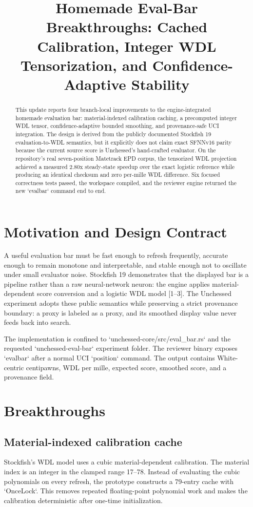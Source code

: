 \documentclass[10pt,conference]{IEEEtran}
\title{Homemade Eval-Bar Breakthroughs: Cached Calibration, Integer WDL Tensorization, and Confidence-Adaptive Stability}
\author{\IEEEauthorblockN{Manus AI}\IEEEauthorblockA{Unchessed UCI Engine Research\\September 2026}}
\begin{document}
\maketitle
\begin{abstract}
This update reports four branch-local improvements to the engine-integrated homemade evaluation bar: material-indexed calibration caching, a precomputed integer WDL tensor, confidence-adaptive bounded smoothing, and provenance-safe UCI integration. The design is derived from the publicly documented Stockfish 19 evaluation-to-WDL semantics, but it explicitly does not claim exact SFNNv16 parity because the current source score is Unchessed's hand-crafted evaluator. On the repository's real seven-position Matetrack EPD corpus, the tensorized WDL projection achieved a measured 2.80x steady-state speedup over the exact logistic reference while producing an identical checksum and zero per-mille WDL difference. Six focused correctness tests passed, the workspace compiled, and the reviewer engine returned the new `evalbar` command end to end.
\end{abstract}

\section{Motivation and Design Contract}
A useful evaluation bar must be fast enough to refresh frequently, accurate enough to remain monotone and interpretable, and stable enough not to oscillate under small evaluator noise. Stockfish 19 demonstrates that the displayed bar is a pipeline rather than a raw neural-network neuron: the engine applies material-dependent score conversion and a logistic WDL model [1--3]. The Unchessed experiment adopts these public semantics while preserving a strict provenance boundary: a proxy is labeled as a proxy, and its smoothed display value never feeds back into search.

The implementation is confined to `unchessed-core/src/eval\_bar.rs` and the requested `unchessed-eval-bar` experiment folder. The reviewer binary exposes `evalbar` after a normal UCI `position` command. The output contains White-centric centipawns, WDL per mille, expected score, smoothed score, and a provenance field.

\section{Breakthroughs}
\subsection{Material-indexed calibration cache}
Stockfish's WDL model uses a cubic material-dependent calibration. The material index is an integer in the clamped range 17--78. Instead of evaluating the cubic polynomials on every refresh, the prototype constructs a 79-entry cache with `OnceLock`. This removes repeated floating-point polynomial work and makes the calibration deterministic after one-time initialization.
\end{document}
